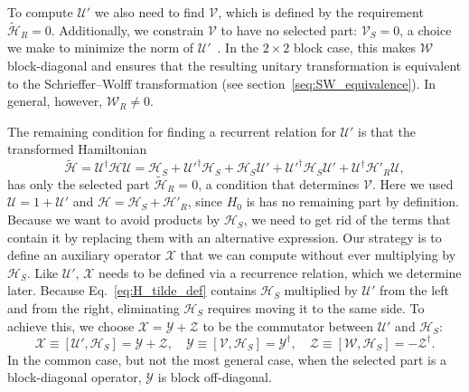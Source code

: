 To compute $\mathcal{U}'$ we also need to find $\mathcal{V}$, which is defined by the requirement $\tilde{\mathcal{H}}_{R} = 0$.
Additionally, we constrain $\mathcal{V}$ to have no selected part: $\mathcal{V}_{S} = 0$, a choice we make to minimize the norm of $\mathcal{U}'$~\cite{Cederbaum_1989}.
In the $2\times 2$ block case, this makes $\mathcal{W}$ block-diagonal and ensures that the resulting unitary transformation is equivalent to the Schrieffer--Wolff transformation (see section~\ref{seq:SW_equivalence}).
In general, however, $\mathcal{W}_{R} \neq 0$.

The remaining condition for finding a recurrent relation for $\mathcal{U}'$ is that the transformed Hamiltonian
%
\begin{equation}
\label{eq:H_tilde_def}
\tilde{\mathcal{H}} = \mathcal{U}^\dagger \mathcal{H} \mathcal{U} = \mathcal{H}_{S} +
\mathcal{U}'^\dagger \mathcal{H}_{S} + \mathcal{H}_{S} \mathcal{U}' + \mathcal{U}'^\dagger \mathcal{H}_{S}
\mathcal{U}' + \mathcal{U}^\dagger\mathcal{H}'_{R}\mathcal{U},
\end{equation}
%
has only the selected part $\tilde{\mathcal{H}}_{R}=0$, a condition that determines $\mathcal{V}$.
Here we used $\mathcal{U}=1+\mathcal{U}'$ and $\mathcal{H} = \mathcal{H}_{S} + \mathcal{H}'_{R}$, since $H_0$ is has no remaining part by definition.
Because we want to avoid products by $\mathcal{H}_{S}$, we need to get rid of the terms that contain it by replacing them with an alternative expression.
Our strategy is to define an auxiliary operator $\mathcal{X}$ that we can compute without ever multiplying by $\mathcal{H}_{S}$.
Like $\mathcal{U}'$, $\mathcal{X}$ needs to be defined via a recurrence relation, which we determine later.
Because Eq.~\eqref{eq:H_tilde_def} contains $\mathcal{H}_{S}$ multiplied by $\mathcal{U}'$ from the left and from the right, eliminating $\mathcal{H}_{S}$ requires moving it to the same side.
To achieve this, we choose $\mathcal{X}=\mathcal{Y}+\mathcal{Z}$ to be the commutator between $\mathcal{U}'$ and $\mathcal{H}_{S}$:
%
\begin{equation}
\label{eq:XYZ}
\mathcal{X} \equiv [\mathcal{U}', \mathcal{H}_{S}] = \mathcal{Y} + \mathcal{Z}, \quad
\mathcal{Y} \equiv [\mathcal{V}, \mathcal{H}_{S}] = \mathcal{Y}^\dagger,\quad
\mathcal{Z} \equiv [\mathcal{W}, \mathcal{H}_{S}] = -\mathcal{Z}^\dagger.
\end{equation}
%
In the common case, but not the most general case, when the selected part is a block-diagonal operator, $\mathcal{Y}$ is block off-diagonal.
